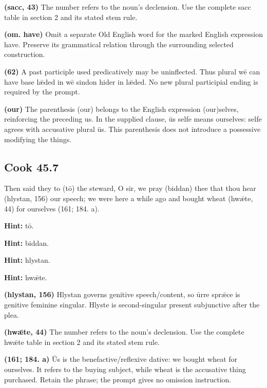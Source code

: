 \textbf{(sacc, 43)} The number refers to the noun’s declension. Use the complete sacc table in section 2 and its stated stem rule.

\textbf{(om. have)} Omit a separate Old English word for the marked English expression have. Preserve its grammatical relation through the surrounding selected construction.

\textbf{(62)} A past participle used predicatively may be uninflected. Thus plural wē can have base lǣded in wē sindon hider in lǣded. No new plural participial ending is required by the prompt.

\textbf{(our)} The parenthesis (our) belongs to the English expression (our)selves, reinforcing the preceding us. In the supplied clause, ūs selfe means ourselves: selfe agrees with accusative plural ūs. This parenthesis does not introduce a possessive modifying the things.

\par\begin{minipage}{\linewidth}\raggedright
\subsection*{Cook 45.7}

Then said they to (tō) the steward, O sir, we pray (biddan) thee that thou hear (hlystan, 156) our speech; we were here a while ago and bought wheat (hwǣte, 44) for ourselves (161; 184. a).

\textbf{Hint:} tō.

\textbf{Hint:} biddan.

\textbf{Hint:} hlystan.

\textbf{Hint:} hwǣte.

\textbf{(hlystan, 156)} Hlystan governs genitive speech/\allowbreak{}content, so ūrre sprǣce is genitive feminine singular. Hlyste is second-singular present subjunctive after the plea.

\textbf{(hwǣte, 44)} The number refers to the noun’s declension. Use the complete hwǣte table in section 2 and its stated stem rule.

\textbf{(161; 184. a)} Ūs is the benefactive/\allowbreak{}reflexive dative: we bought wheat for ourselves. It refers to the buying subject, while wheat is the accusative thing purchased. Retain the phrase; the prompt gives no omission instruction.

\end{minipage}\par\addvspace{4pt}

